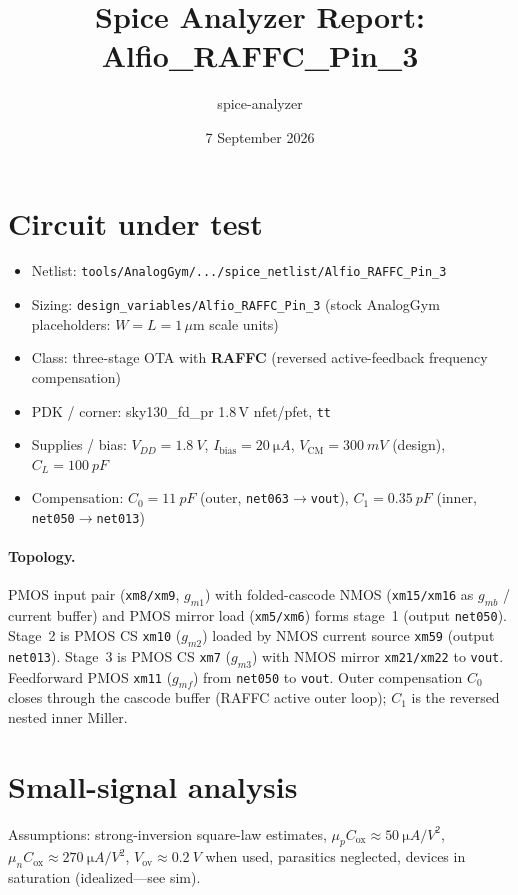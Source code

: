 \documentclass[11pt]{article}
\title{Spice Analyzer Report: Alfio\_RAFFC\_Pin\_3}
\author{spice-analyzer}
\date{7 September 2026}
\begin{document}
\maketitle

\section{Circuit under test}
\begin{itemize}
  \item Netlist: \texttt{tools/AnalogGym/.../spice\_netlist/Alfio\_RAFFC\_Pin\_3}
  \item Sizing: \texttt{design\_variables/Alfio\_RAFFC\_Pin\_3} (stock AnalogGym placeholders: $W{=}L{=}1\,\mu\mathrm{m}$ scale units)
  \item Class: three-stage OTA with \textbf{RAFFC} (reversed active-feedback frequency compensation)
  \item PDK / corner: sky130\_fd\_pr 1.8\,V nfet/pfet, \texttt{tt}
  \item Supplies / bias: $V_{DD}{=}\SI{1.8}{V}$, $I_{\mathrm{bias}}{=}\SI{20}{\micro A}$, $V_{\mathrm{CM}}{=}\SI{300}{mV}$ (design), $C_L{=}\SI{100}{pF}$
  \item Compensation: $C_0{=}\SI{11}{pF}$ (outer, \texttt{net063}$\to$\texttt{vout}), $C_1{=}\SI{0.35}{pF}$ (inner, \texttt{net050}$\to$\texttt{net013})
\end{itemize}

\paragraph{Topology.}
PMOS input pair (\texttt{xm8/xm9}, $g_{m1}$) with folded-cascode NMOS (\texttt{xm15/xm16} as $g_{mb}$ / current buffer) and PMOS mirror load (\texttt{xm5/xm6}) forms stage~1 (output \texttt{net050}).
Stage~2 is PMOS CS \texttt{xm10} ($g_{m2}$) loaded by NMOS current source \texttt{xm59} (output \texttt{net013}).
Stage~3 is PMOS CS \texttt{xm7} ($g_{m3}$) with NMOS mirror \texttt{xm21/xm22} to \texttt{vout}.
Feedforward PMOS \texttt{xm11} ($g_{mf}$) from \texttt{net050} to \texttt{vout}.
Outer compensation $C_0$ closes through the cascode buffer (RAFFC active outer loop); $C_1$ is the reversed nested inner Miller.

\section{Small-signal analysis}
Assumptions: strong-inversion square-law estimates, $\mu_p C_{\mathrm{ox}}\!\approx\!\SI{50}{\micro A/V^2}$, $\mu_n C_{\mathrm{ox}}\!\approx\!\SI{270}{\micro A/V^2}$, $V_{\mathrm{ov}}\!\approx\!\SI{0.2}{V}$ when used, parasitics neglected, devices in saturation (idealized---see sim).
\end{document}
